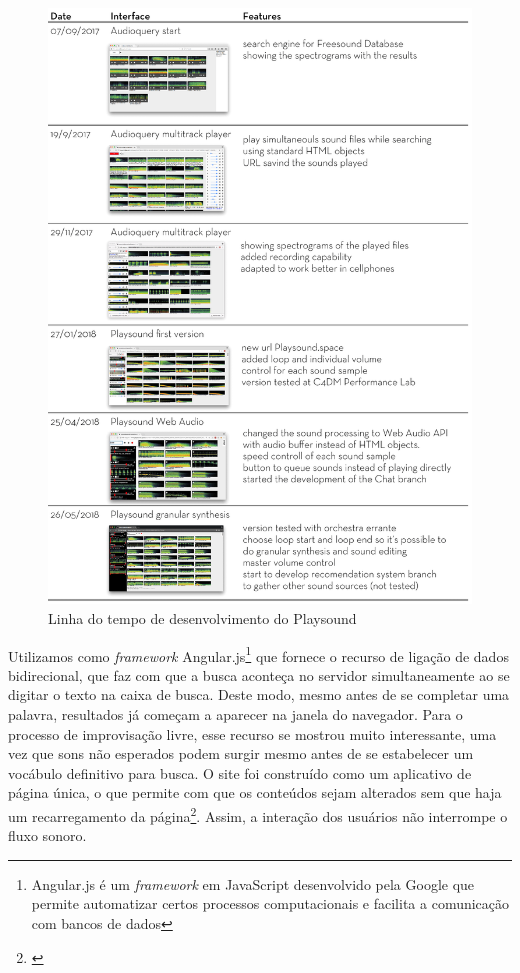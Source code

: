 \begin{figure}

\includegraphics[width=1\textwidth]{pictures/playsoundtimeline}
\caption{\label{pstimeline}Linha do tempo de desenvolvimento do Playsound}
\label{fig:timeline}
\end{figure}

Utilizamos como \emph{framework} Angular.js\footnote{Angular.js é um \emph{framework} em JavaScript desenvolvido pela Google que permite automatizar certos processos computacionais e facilita a comunicação com bancos de dados} que fornece o recurso de ligação de dados bidirecional, que faz com que a busca aconteça no servidor simultaneamente ao se digitar o texto na caixa de busca. Deste modo, mesmo antes de se completar uma palavra, resultados já começam a aparecer na janela do navegador. Para o processo de improvisação livre, esse recurso se mostrou muito interessante, uma vez que sons não esperados podem surgir mesmo antes de se estabelecer um vocábulo definitivo para busca. O site foi construído como um aplicativo de página única, o que permite com que os conteúdos sejam alterados sem que haja um recarregamento da página\footnote{\cite{Jadhav}}. Assim, a interação dos usuários não interrompe o fluxo sonoro.

